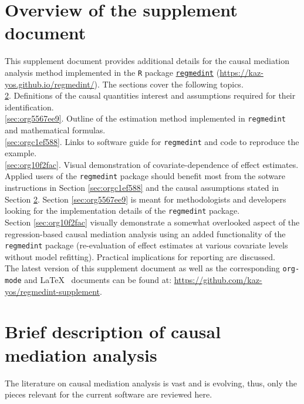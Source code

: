 \documentclass[10pt]{article}
\date{\today}
\title{}
\begin{document}
\tableofcontents

\sloppy
\setcounter{page}{0}
\newpage
\setcounter{section}{-1}
\section{Overview of the supplement document}
\label{sec:orgee7025c}

This supplement document provides additional details for the causal mediation analysis method implemented in the \texttt{R} package \href{https://kaz-yos.github.io/regmedint/}{\texttt{regmedint}} (\url{https://kaz-yos.github.io/regmedint/}). The sections cover the following topics.\\

\ref{sec:orgddc3afe}. Definitions of the causal quantities interest and assumptions required for their identification.\\
\ref{sec:org5567ee9}. Outline of the estimation method implemented in \texttt{regmedint} and mathematical formulas.\\
\ref{sec:orgc1ef588}. Links to software guide for \texttt{regmedint} and code to reproduce the example.\\
\ref{sec:org10f2fac}. Visual demonstration of covariate-dependence of effect estimates.\\

Applied users of the \texttt{regmedint} package should benefit most from the sotware instructions in Section \ref{sec:orgc1ef588} and the causal assumptions stated in Section \ref{sec:orgddc3afe}. Section \ref{sec:org5567ee9} is meant for methodologists and developers looking for the implementation details of the \texttt{regmedint} package.\\

Section \ref{sec:org10f2fac} visually demonstrate a somewhat overlooked aspect of the regression-based causal mediation analysis using an added functionality of the \texttt{regmedint} package (re-evaluation of effect estimates at various covariate levels without model refitting). Practical implications for reporting are discussed.\\

The latest version of this supplement document as well as the corresponding \texttt{org-mode} and \LaTeX ~ documents can be found at: \url{https://github.com/kaz-yos/regmedint-supplement}.


\section{Brief description of causal mediation analysis}
\label{sec:orgddc3afe}
The literature on causal mediation analysis is vast \cite{vanderweeleExplanationCausalInference2015} and is evolving, thus, only the pieces relevant for the current software are reviewed here.
\end{document}
